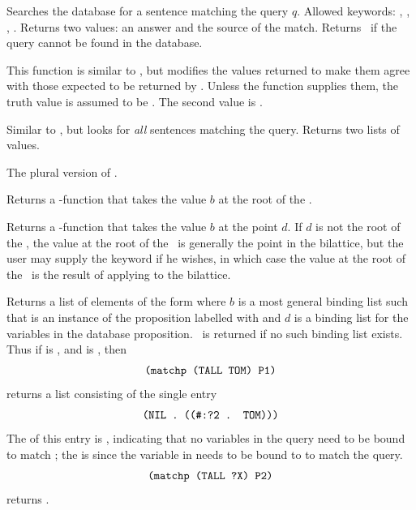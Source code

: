 \begin{list}{}{\setlength{\labelwidth}{1.5in}\setlength{\labelsep}{.25in}
\setlength{\leftmargin}{1.75in}}
\item [\itype{lookup(q)}] Searches the database for a sentence
matching the query $q$.  Allowed keywords: , ,
\apa, \somo.  Returns two values: an answer and the source of the
match.  Returns \NIL\ if the query cannot be found in the database.

\item [\itype{lookup-call(fn p)}] This function is similar to
, but modifies the values returned to make them agree
with those expected to be returned by .  Unless the
function  supplies them, the truth value is assumed to be
.  The second value is .

\item [\itype{lookups(q)}] Similar to , but looks
for {\em all\/} sentences matching the query.  Returns two lists of
values.

\item [\itype{lookups-call(fn p)}] The plural version of
.


\item [\itype{make-root(dag bilattice b)}] Returns a \dg-function that
takes the value $b$ at the root of the \dg.

\item [\itype{make-tv(dag bilattice d b)}] Returns a \dg-function that
takes the value $b$ at the point $d$.  If $d$ is not the root of the
\dg, the value at the root of the \dg\ is generally the point
 in the bilattice, but the user may supply the keyword
 if he wishes, in which case the value at the root of
the \dg\ is the result of applying  to the bilattice.

\item [\itype{matchp(pattern atom)}] Returns a list of elements of
the form  where $b$ is a most general binding list such
that  is an instance of the proposition
labelled with  and $d$ is a binding list for the variables
in the database proposition.  \NIL\ is returned if no such binding
list exists.  Thus if  is , and 
is , then
 \[\mbox{\tt (matchp (TALL TOM) P1)}\]
returns a list consisting of the single entry 
 \[\mbox{\tt (NIL . ((\#:?2 . TOM)))}\]
 The  of this entry is \NIL, indicating that no variables
in the query need to be bound to match ; the  is
 since the variable  in 
needs to be bound to  to match the query.
 \[\mbox{\tt (matchp (TALL ?X) P2)}\]
returns .


\end{list}

